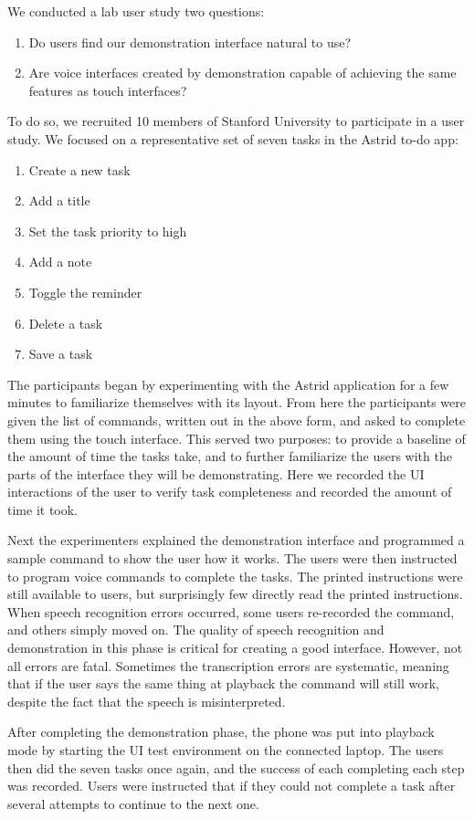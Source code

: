 \documentclass[letterpaper]{article}
\begin{document}
We conducted a lab user study two questions:
\begin{enumerate}
\item Do users find our demonstration interface natural to use?
\item Are voice interfaces created by demonstration capable of achieving the same features as touch interfaces?
\end{enumerate}

To do so, we recruited 10 members of Stanford University to participate in a user study. We focused on a representative set of 
seven tasks in the Astrid to-do app:
\begin{enumerate}
\item Create a new task
\item Add a title
\item Set the task priority to high
\item Add a note
\item Toggle the reminder
\item Delete a task
\item Save a task
\end{enumerate}
The participants began by experimenting with the Astrid application for a few minutes to familiarize themselves with its layout.
From here the participants were given the list of commands, written out in the above form, and asked to complete them using
the touch interface. This served two purposes: to provide a baseline of the amount of time the tasks take, and to further
familiarize the users with the parts of the interface they will be demonstrating. Here we recorded the UI interactions
of the user to verify task completeness and recorded the amount of time it took.

Next the experimenters explained the demonstration interface and programmed a sample command to show the user how it works.
The users were then instructed to program voice commands to complete the tasks. The printed instructions were
still available to users, but surprisingly few directly read the printed instructions. When speech recognition errors
occurred, some users re-recorded the command, and others simply moved on. The quality of speech recognition and demonstration
in this phase is critical for creating a good interface. However, not all errors are fatal. Sometimes the transcription
errors are systematic, meaning that if the user says the same thing at playback the command will still work, despite
the fact that the speech is misinterpreted.

After completing the demonstration phase, the phone was put into playback mode by starting the UI test environment
on the connected laptop. The users then did the seven tasks once again, and the success of each completing
each step was recorded. Users were instructed that if they could not complete a task after several attempts
to continue to the next one.
\end{document}
